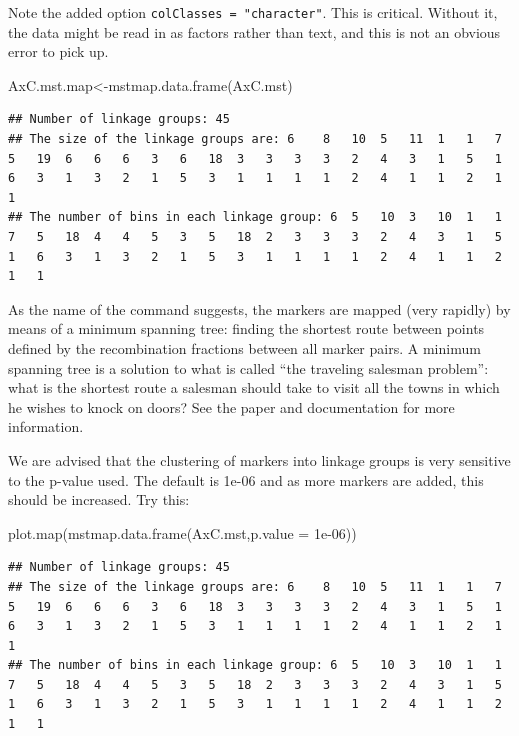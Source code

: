 \documentclass[
]{book}
\newenvironment{Shaded}{\begin{snugshade}}{\end{snugshade}}
\newcommand{\AttributeTok}[1]{\textcolor[rgb]{0.77,0.63,0.00}{#1}}
\newcommand{\FloatTok}[1]{\textcolor[rgb]{0.00,0.00,0.81}{#1}}
\newcommand{\FunctionTok}[1]{\textcolor[rgb]{0.00,0.00,0.00}{#1}}
\newcommand{\NormalTok}[1]{#1}
\newcommand{\OtherTok}[1]{\textcolor[rgb]{0.56,0.35,0.01}{#1}}
\begin{document}
Note the added option \texttt{colClasses\ =\ "character"}. This is critical. Without it, the data might be read in as factors rather than text, and this is not an obvious error to pick up.

\begin{Shaded}
\begin{Highlighting}[]
\NormalTok{AxC.mst.map}\OtherTok{\textless{}{-}}\FunctionTok{mstmap.data.frame}\NormalTok{(AxC.mst)}
\end{Highlighting}
\end{Shaded}

\begin{verbatim}
## Number of linkage groups: 45
## The size of the linkage groups are: 6    8   10  5   11  1   1   7   5   19  6   6   6   3   6   18  3   3   3   3   2   4   3   1   5   1   6   3   1   3   2   1   5   3   1   1   1   1   2   4   1   1   2   1   1   
## The number of bins in each linkage group: 6  5   10  3   10  1   1   7   5   18  4   4   5   3   5   18  2   3   3   3   2   4   3   1   5   1   6   3   1   3   2   1   5   3   1   1   1   1   2   4   1   1   2   1   1   
\end{verbatim}

As the name of the command suggests, the markers are mapped (very rapidly) by means of a minimum spanning tree: finding the shortest route between points defined by the recombination fractions between all marker pairs. A minimum spanning tree is a solution to what is called ``the traveling salesman problem'': what is the shortest route a salesman should take to visit all the towns in which he wishes to knock on doors? See the paper and documentation for more information.

We are advised that the clustering of markers into linkage groups is very sensitive to the p-value used. The default is 1e-06 and as more markers are added, this should be increased. Try this:

\begin{Shaded}
\begin{Highlighting}[]
\FunctionTok{plot.map}\NormalTok{(}\FunctionTok{mstmap.data.frame}\NormalTok{(AxC.mst,}\AttributeTok{p.value =} \FloatTok{1e{-}06}\NormalTok{)) }
\end{Highlighting}
\end{Shaded}

\begin{verbatim}
## Number of linkage groups: 45
## The size of the linkage groups are: 6    8   10  5   11  1   1   7   5   19  6   6   6   3   6   18  3   3   3   3   2   4   3   1   5   1   6   3   1   3   2   1   5   3   1   1   1   1   2   4   1   1   2   1   1   
## The number of bins in each linkage group: 6  5   10  3   10  1   1   7   5   18  4   4   5   3   5   18  2   3   3   3   2   4   3   1   5   1   6   3   1   3   2   1   5   3   1   1   1   1   2   4   1   1   2   1   1   
\end{verbatim}
\end{document}
